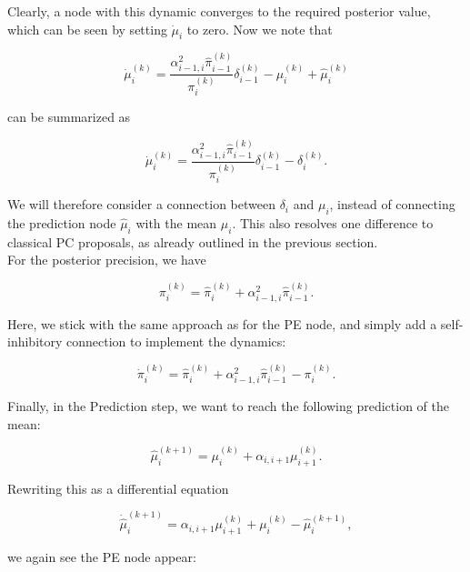 Clearly, a node with this dynamic converges to the required posterior value, which can be seen by setting $\dot{\mu}_i$ to zero. Now we note that

\begin{equation}
	\dot{\mu}_i^{(k)} = \frac{\alpha_{i-1,i}^2 \hat{\pi}_{i-1}^{(k)}}{\pi_i^{(k)}} \delta_{i-1}^{(k)} - \mu_i^{(k)} + \hat{\mu}_i^{(k)}
\end{equation}

can be summarized as 

\begin{equation}
	\dot{\mu}_i^{(k)} = \frac{\alpha_{i-1,i}^2 \hat{\pi}_{i-1}^{(k)}}{\pi_i^{(k)}} \delta_{i-1}^{(k)} - \delta_i^{(k)}.
\end{equation}

We will therefore consider a connection between $\delta_i$ and $\mu_i$, instead of connecting the prediction node $\hat{\mu}_i$ with the mean $\mu_i$. This also resolves one difference to classical PC proposals, as already outlined in the previous section.\\

For the posterior precision, we have

\begin{equation}
	\pi_i^{(k)} = \hat{\pi}_i^{(k)} + \alpha_{i-1,i}^2 \hat{\pi}_{i-1}^{(k)}.
\end{equation}

Here, we stick with the same approach as for the \textsf{PE} node, and simply add a self-inhibitory connection to implement the dynamics:

\begin{equation}
	\dot{\pi}_i^{(k)} = \hat{\pi}_i^{(k)} + \alpha_{i-1,i}^2 \hat{\pi}_{i-1}^{(k)} - \pi_i^{(k)}.
\end{equation}

Finally, in the \textsf{Prediction} step, we want to reach the following prediction of the mean:

\begin{equation}
	\hat{\mu}_i^{(k+1)} = \mu_i^{(k)} + \alpha_{i,i+1} \mu_{i+1}^{(k)}.
\end{equation}

Rewriting this as a differential equation

\begin{equation}
	\dot{\hat{\mu}}_i^{(k+1)} = \alpha_{i,i+1} \mu_{i+1}^{(k)} + \mu_i^{(k)} - \hat{\mu}_i^{(k+1)}, 
\end{equation}

we again see the \textsf{PE} node appear:

